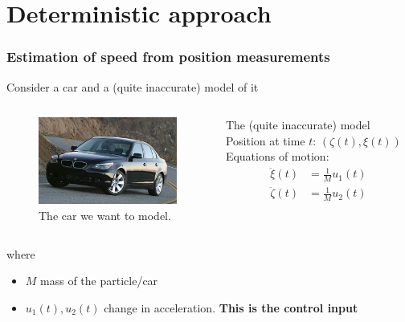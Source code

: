 \section{Deterministic approach}
\begin{frame} 
	\frametitle{Estimation of speed from position measurements} 
	Consider a car and a (quite inaccurate) model of it
	\begin{columns}[onlytextwidth,t]
		\begin{figure}[h]
			\includegraphics[width=\textwidth]{fig/auto_real}%
			\caption*{The car we want to model.\footnotemark} 
		\end{figure}
		\begin{block}{The (quite inaccurate) model}
		Position at time $t$: $(\zeta(t), \xi(t))$ \\%
		Equations of motion:
		\begin{align*}
		  \ddot{\xi}(t)& = \frac{1}{M} u_1(t) \\
		  \ddot{\zeta}(t)& = \frac{1}{M} u_2(t)
		\end{align*}
		\end{block}
	\end{columns}
	
	where 
	\begin{itemize}
		\item $M$ mass of the particle/car\\
		\item $u_1(t), u_2(t)$ change in acceleration. \textbf{This is the control input}\\
        \phantom{x}
	\end{itemize}
\end{frame}

